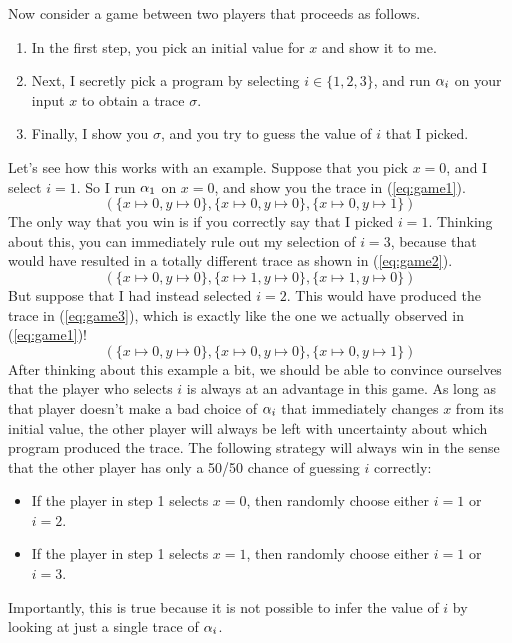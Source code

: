 \documentclass[11pt,twoside]{scrartcl}
\begin{document}
Now consider a game between two players that proceeds as follows.
\begin{enumerate}
\item In the first step, you pick an initial value for $x$ and show it to me.
\item Next, I secretly pick a program by selecting $i \in \{1,2,3\}$, and run $\alpha_i$ on your input $x$ to obtain a trace $\sigma$.
\item Finally, I show you $\sigma$, and you try to guess the value of $i$ that I picked.
\end{enumerate}
Let's see how this works with an example. Suppose that you pick $x = 0$, and I select $i = 1$. So I run $\alpha_1$ on $x = 0$, and show you the trace in (\ref{eq:game1}).
\begin{equation}
\label{eq:game1}
(\{x \mapsto 0, y \mapsto 0\}, \{x \mapsto 0, y \mapsto 0\}, \{x \mapsto 0, y \mapsto 1\})
\end{equation}
The only way that you win is if you correctly say that I picked $i = 1$. Thinking about this, you can immediately rule out my selection of $i = 3$, because that would have resulted in a totally different trace as shown in (\ref{eq:game2}).
\begin{equation}
\label{eq:game2}
(\{x \mapsto 0, y \mapsto 0\}, \{x \mapsto 1, y \mapsto 0\}, \{x \mapsto 1, y \mapsto 0\})
\end{equation}
But suppose that I had instead selected $i = 2$. This would have produced the trace in (\ref{eq:game3}), which is exactly like the one we actually observed in (\ref{eq:game1})!
\begin{equation}
\label{eq:game3}
(\{x \mapsto 0, y \mapsto 0\}, \{x \mapsto 0, y \mapsto 0\}, \{x \mapsto 0, y \mapsto 1\})
\end{equation}
After thinking about this example a bit, we should be able to convince ourselves that the player who selects $i$ is always at an advantage in this game. As long as that player doesn't make a bad choice of $\alpha_i$ that immediately changes $x$ from its initial value, the other player will always be left with uncertainty about which program produced the trace. The following strategy will always win in the sense that the other player has only a 50/50 chance of guessing $i$ correctly:
\begin{itemize}
\item If the player in step 1 selects $x = 0$, then randomly choose either $i=1$ or $i = 2$.
\item If the player in step 1 selects $x = 1$, then randomly choose either $i = 1$ or $i = 3$.
\end{itemize}
Importantly, this is true because it is not possible to infer the value of $i$ by looking at just a single trace of $\alpha_i$.
\end{document}
